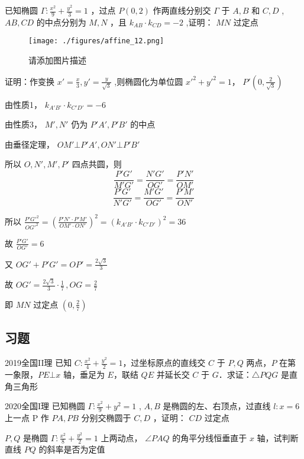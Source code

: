 \begin{example}{}
 已知椭圆 \(\Gamma:\frac{x^2}{9}+\frac{y^2}{3}=1\) ，过点 \(P(0,2)\) 作两直线分别交 \(\Gamma\) 于 \(A,B\) 和 \(C,D\) , \(AB,CD\) 的中点分别为 \(M,N\) ，且 \(k_{AB}\cdot k_{CD}=-2\) ,证明： \(MN\) 过定点
\begin{figure}[ht]
\centering
\texttt{[image: ./figures/affine\_12.png]}
\caption{请添加图片描述} \label{affine_fig12}
\end{figure}
证明：作变换 \(x'=\frac{x}{3},y'=\frac{y}{\sqrt{3}}\) ,则椭圆化为单位圆 \(x'^2+y'^2=1\)， \(P'\left(0,\frac{2}{\sqrt{3}}\right)\)

由性质1， \(k_{A'B'}\cdot k_{C'D'}=-6\)

由性质3， \(M',N'\) 仍为 \(P'A',P'B'\) 的中点

由垂径定理， \(OM'\bot P'A',ON'\bot P'B'\)

所以 \(O,N',M',P'\) 四点共圆，则 
$$\frac{P'G'}{M'G'}=\frac{N'G'}{OG'}=\frac{P'N'}{OM'}$$
$$\frac{P'G'}{N'G'}=\frac{M'G'}{OG'}=\frac{P'M'}{ON'}$$

所以 \(\frac{P'G'^2}{OG'^2}=\left(\frac{P'N'\cdot P'M'}{OM'\cdot ON'}\right)^2=\left(k_{A'B'}\cdot k_{C'D'}\right)^2=36\) 

故 \(\frac{P'G'}{OG'}=6\) 

又 \(OG'+P'G'=OP'=\frac{2\sqrt{3}}{3}\) 

故 \(OG'=\frac{2\sqrt{3}}{3}\cdot\frac{1}{7}\,,OG=\frac{2}{7}\) 

即 \(MN\) 过定点 \(\left(0,\frac{2}{7}\right)\) 
\end{example}
\subsection{习题}
\begin{exercise}{2019全国II理}
已知 \(C:\frac{x^2}4+\frac{y^2}2=1\)，过坐标原点的直线交 \(C\) 于 \(P,Q\) 两点，\(P\) 在第一象限，\(PE\bot x\) 轴，垂足为 \(E\)，联结 \(QE\) 并延长交 \(C\) 于 \(G\)．求证：\(\triangle PQG\) 是直角三角形
\end{exercise}
\begin{exercise}{2020全国I理}
已知椭圆 \(\Gamma:\frac{x^2}{9}+y^2=1\) , \(A,B\) 是椭圆的左、右顶点，过直线 \(l:x=6\) 上一点 P 作 \(PA,PB\) 分别交椭圆于 \(C,D\) ，证明： \(CD\) 过定点
\end{exercise}

\begin{exercise}{}
 \(P,Q\) 是椭圆 \(\Gamma:\frac{x^2}{8}+\frac{y^2}{2}=1\) 上两动点， \(\angle PAQ\) 的角平分线恒垂直于 \(x\) 轴，试判断直线 \(PQ\) 的斜率是否为定值
\end{exercise}